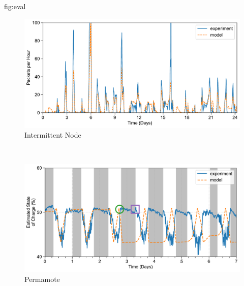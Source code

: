 \begin{definefigure}{fig:eval}
  \centering
  \begin{subfigure}{\columnwidth}
    \centering
    \includegraphics[width=\linewidth]{figs/capacity/experiment_pkt/exp_vs_sim_pkt}
    \caption{Intermittent Node}
    \label{fig:eval:pkt}
  \end{subfigure}\\%
  \begin{subfigure}{\columnwidth}
    \centering
    \includegraphics[width=\linewidth]{figs/capacity/experiment_soc/exp_vs_sim_soc}
    \caption{Permamote}
    \label{fig:eval:soc}
  \end{subfigure}
    \caption{Model comparison to deployed hardware.
    \normalfont
    Data from a three month deployment of two systems is used to verify our model.
    (a) We use three weeks of lux measurements %
    to estimate irradiance and model the number of packets transmitted by an
    intermittent node. Average daily error is 15\%, with a standard deviation
    of 17\%. (b) We model and measure a \name's state of charge while running a
    ``sense and send'' workload with a 1\,s period for a week, beginning at
    midnight on the first day. Secondary charging hysteresis
}
\end{definefigure}

